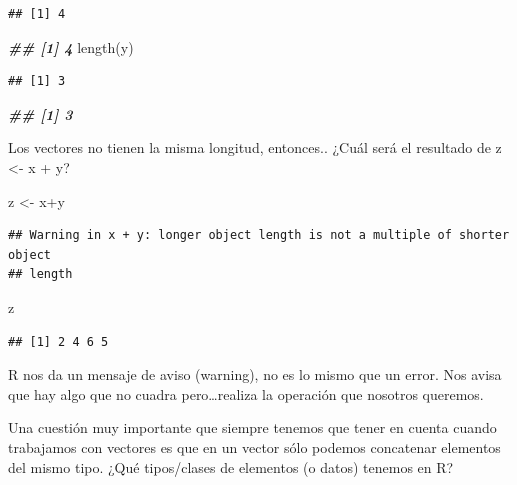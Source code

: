 \documentclass[
]{book}
\newenvironment{Shaded}{\begin{snugshade}}{\end{snugshade}}
\newcommand{\DocumentationTok}[1]{\textcolor[rgb]{0.56,0.35,0.01}{\textbf{\textit{#1}}}}
\newcommand{\FunctionTok}[1]{\textcolor[rgb]{0.00,0.00,0.00}{#1}}
\newcommand{\NormalTok}[1]{#1}
\newcommand{\OtherTok}[1]{\textcolor[rgb]{0.56,0.35,0.01}{#1}}
\newcommand{\SpecialCharTok}[1]{\textcolor[rgb]{0.00,0.00,0.00}{#1}}
\begin{document}
\begin{verbatim}
## [1] 4
\end{verbatim}

\begin{Shaded}
\begin{Highlighting}[]
\DocumentationTok{\#\# [1] 4}
\FunctionTok{length}\NormalTok{(y)}
\end{Highlighting}
\end{Shaded}

\begin{verbatim}
## [1] 3
\end{verbatim}

\begin{Shaded}
\begin{Highlighting}[]
\DocumentationTok{\#\# [1] 3}
\end{Highlighting}
\end{Shaded}

Los vectores no tienen la misma longitud, entonces.. ¿Cuál será el resultado de z \textless- x + y?

\begin{Shaded}
\begin{Highlighting}[]
\NormalTok{z }\OtherTok{\textless{}{-}}\NormalTok{ x}\SpecialCharTok{+}\NormalTok{y}
\end{Highlighting}
\end{Shaded}

\begin{verbatim}
## Warning in x + y: longer object length is not a multiple of shorter object
## length
\end{verbatim}

\begin{Shaded}
\begin{Highlighting}[]
\NormalTok{z}
\end{Highlighting}
\end{Shaded}

\begin{verbatim}
## [1] 2 4 6 5
\end{verbatim}

R nos da un mensaje de aviso (warning), no es lo mismo que un error. Nos avisa que hay algo que no cuadra pero\ldots realiza la operación que nosotros queremos.

Una cuestión muy importante que siempre tenemos que tener en cuenta cuando trabajamos con vectores es que en un vector sólo podemos concatenar elementos del mismo tipo. ¿Qué tipos/clases de elementos (o datos) tenemos en R?
\end{document}
